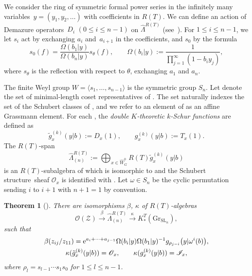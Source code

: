 \documentclass[pdftex]{sigma}
\numberwithin{equation}{section}
\newcommand{\Gr}{\mathrm{Gr}}
\newcommand{\Rep}{{R(T)}}
\newcommand{\SL}{\mathrm{SL}}
\newtheorem{Theorem}{Theorem}[section]
\theoremstyle{definition}
\begin{document}
We consider the
ring \smash{$\hat{\Lambda}^{\Rep}$} of symmetric
formal power series
in the infinitely many variables~${y=(y_1,y_2,\dots)}$ with coefficients in
$\Rep$.
We can define an action of Demazure operators~$D_i$ $(0\le i\le n-1)$
on $\hat{\Lambda}^{\Rep}$ (see~\cite{ISY}).
For $1\le i\le n-1$, we
let $s_i$ act by exchanging
$a_i$ and~$a_{i+1}$
in the coefficients,
and $s_0$ by
the formula
\begin{equation}
\label{eq:s0_Omega}
s_0(f)=\frac{\Omega(b_1|y)}{\Omega(b_n|y)}s_\theta(f),\qquad
\Omega(b_i|y):=\frac{1}{\prod_{j=1}^{\infty}(1-b_i y_j)},
\end{equation}
where $s_\theta $ is the reflection with respect to $\theta$,
exchanging $a_1$ and $a_n$.

The finite Weyl group $W=\langle s_1,\dots,s_{n-1}\rangle$ is the symmetric group $S_n$.
Let  denote the set of minimal-length coset representatives of . The set  naturally indexes the set of the Schubert classes of \smash{$K_*^T(\Gr_{G})$},
and we refer to an element of  as an affine Grassmann element.
For each
\cite{ISY},
the \emph{double $K$-theoretic $k$-Schur functions}
are defined
as
\begin{equation}
\label{eq:def:tg,g}
\tilde{g}_x^{(k)}(y|b):=D_x (1),\qquad
g_x^{(k)}(y|b):=T_x (1).
\end{equation}
The $\Rep$-span
\[
\hat{\Lambda}^{\Rep}_{(n)}:=\bigoplus_{x\in \hat{W}_G^0}
\Rep \tilde{g}_x^{(k)}(y|b)
\]
is an $\Rep$-subalgebra of
\smash{$\hat{\Lambda}
_\Rep$} which is
isomorphic to
\smash{$K_*^T(\Gr_{\SL_n})$} and the Schubert structure~sheaf $\mathscr{O}_x$
is identified with .
Let $\omega\in S_n$ be the cyclic permutation sending $i$ to $i+1$ with $n+1=1$ by convention.



\begin{Theorem}[\cite{ISY}]
\label{thm:ISY}
There are
isomorphisms $\beta$, $\kappa$ of $R(T)$-algebras
\[%
\mathscr{O}(\mathscr{Z})
\overset{\beta}{\longrightarrow }
 \hat{\Lambda}_{(n)}^\Rep
 \overset{\kappa}{\longrightarrow}
 K_*^T(\Gr_{\SL_n}),
\]
such that
\begin{gather}
\beta(z_{ij}/z_{11})= {\rm e}^{a_i+\cdots+a_{j-1}}\Omega(b_i|y)\Omega(b_1|y)^{-1}g_{\rho_{j-i}}\big(y|\omega^i(b)\big),\nonumber
\\
\kappa(\tilde{g}_{x}^{(k)}(y|b))
= \mathscr{O}_x,
\qquad
\kappa(g_{x}^{(k)}(y|b))=\mathscr{I}_{x},\label{eq:zij_in_KkSchur}
\end{gather}
where $\rho_l=s_{l-1}\cdots s_{1}s_{0}$ for $1\le l\le n-1 $.
\end{Theorem}
\end{document}

